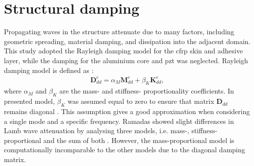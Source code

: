 \section{Structural damping}
\label{sec:damping}

Propagating waves in the structure attenuate due to many factors, including geometric spreading, material damping, and dissipation into the adjacent domain.
This study adopted the Rayleigh damping model for the \ac{cfrp} skin and adhesive layer, while the damping for the aluminium core and \ac{pzt} was neglected.
Rayleigh damping model is defined as \cite{wandowski2017guided}:
\begin{eqnarray}
	\textbf{D}_{dd}^e = \alpha_M \textbf{M}_{dd}^e + \beta_K \textbf{K}_{dd}^e,
	\label{eq:damping}
\end{eqnarray}
%
%
where \(\alpha_M\) and \(\beta_K\) are the mass- and stiffness- proportionality coefficients.
In presented model, \(\beta_K\) was assumed equal to zero to ensure that matrix \(\textbf{D}_{dd}\) remains diagonal \cite{schulte2011simulation, wandowski2017guided}.
This assumption gives a good approximation when considering a single mode and a specific frequency. 
Ramadas showed slight differences in Lamb wave attenuation by analysing three models, i.e. mass-, stiffness-proportional and the sum of both \cite{ramadas2011modelling}.
However, the mass-proportional model is computationally incomparable to the other models due to the diagonal damping matrix.